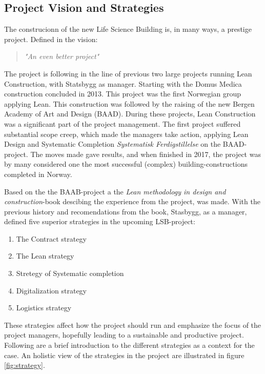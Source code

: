 \subsection{Project Vision and Strategies}
The construcionn of the new Life Science Building is, in many ways, a prestige project. Defined in the vision:
\begin{quotation}
    \textit{"An even better project"}
\end{quotation}
The project is following in the line of previous two large projects running Lean Construction, with Statsbygg as manager. Starting with the Domus Medica construction concluded in 2013. This project was the first Norwegian group applying Lean. This construction was followed by the raising of the new Bergen Academy of Art and Design (BAAD). During these projects, Lean Construction was a significant part of the project management. The first project suffered substantial scope creep, which made the managers take action, applying Lean Design and Systematic Completion \textit{Systematisk Ferdigstillelse} on the BAAD-project. The moves made gave results, and when finished in 2017, the project was by many considered one the most successful (complex) building-constructions completed in Norway.

Based on the the BAAB-project a the \textit{Lean methodology in design and construction}-book \cite{lean_i_praksis} descibing the experience from the project, was made. With the previous history and recomendations from the book, Stasbygg, as a manager, defined five superior strategies in the upcoming LSB-project: 
\begin{enumerate}
    \item The Contract strategy
    \item The Lean strategy
    \item Stretegy of Systematic completion
    \item Digitalization strategy
    \item Logistics strategy
\end{enumerate}
These strategies affect how the project should run and emphasize the focus of the project managers, hopefully leading to a sustainable and productive project. Following are a brief introduction to the different strategies as a context for the case. An holistic view of the strategies in the project are illustrated in figure \ref{fig:strategy}. 

